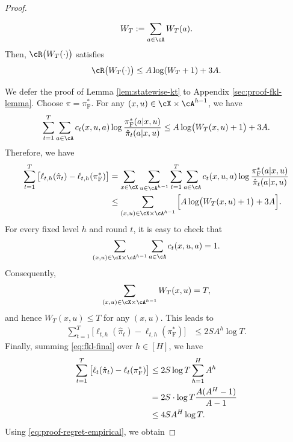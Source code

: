 \documentclass[11pt]{article}
\newcommand{\pif}{\pi_{\mathrm{F}}}
\begin{document}
\begin{proof}
\begin{lemma}
\begin{align*}
    W_T:=\sum_{a\in\cA}W_T(a).
\end{align*}
Then, $\cR\big(W_T(\cdot)\big)$ satisfies
\begin{align}
\notag
    \cR\bigl(W_T(\cdot)\bigr)
    \leq
    A\log(W_T+1)+3A.
\end{align}
\end{lemma}
We defer the proof of Lemma \ref{lem:statewise-kt} to Appendix \ref{sec:proof-fkl-lemma}. Choose $\pi= \pif^*$. For any
$(x,u)\in\cX\times\cA^{h-1}$, we have
\begin{align}
\sum_{t=1}^T \sum_{a\in\cA}
    c_t(x,u,a)
    \log
    \frac{\pif^*(a|x,u)}
         {\hat\pi_t(a|x,u)} \le A\log\bigl(W_T(x,u)+1\bigr)+3A
    \notag.
\end{align}
Therefore, we have
\begin{align*}
    \sum_{t=1}^T
        \big[
            \ell_{t,h}(\hat\pi_t)
            -
            \ell_{t,h}(\pif^*)
        \big] &= \sum_{x\in\cX}\sum_{u\in\cA^{h-1}}\sum_{t=1}^T\sum_{a\in\cA}c_t(x,u,a)\log\frac{\pif^*(a|x,u)}{\hat\pi_t(a|x,u)}\\
        &\leq
    \sum_{(x,u)\in\cX\times\cA^{h-1}}
    \Big[
        A\log\bigl(W_T(x,u)+1\bigr)+3A
    \Big].
\end{align*}
For every fixed level $h$ and round $t$, it is easy to check that
\begin{align*}
    \sum_{(x,u)\in\cX \times \cA^{h-1}} \sum_{a\in \cA}
    c_t(x,u,a)
    =1.
\end{align*}
Consequently,
\begin{align*}
    \sum_{(x,u)\in\cX\times\cA^{h-1}}W_T(x,u)
    =T,
\end{align*}
and hence $W_T(x,u)\leq T$ for any $(x,u)$. This leads to
\begin{align}
\label{eq:fkl-final}
    \sum_{t=1}^T
        \big[
            \ell_{t,h}(\hat\pi_t)
            -
            \ell_{t,h}(\pif^*)
        \big] 
        &\leq
    2SA^{h} \log T.
\end{align}
Finally, summing \eqref{eq:fkl-final} over
$h\in[H]$, we have
\begin{align}
\notag
    \sum_{t=1}^T
        \big[
            \ell_{t}(\hat\pi_t)
            -
            \ell_{t}(\pif^*)
        \big] 
        &\leq
    2S \log T \sum_{h=1}^H A^h \\\notag
    &= 2S \cdot \log T \frac{A(A^{H}-1)}{A-1}\\\label{eq:fkl-final2}
    &\le 4S A^H\log T.
\end{align}
Using \eqref{eq:proof-regret-empirical}, we obtain 

\end{proof}
\end{document}
